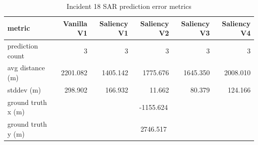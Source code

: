 \begin{table}[ht]
\centering
\caption{Incident 18 SAR prediction error metrics}
\label{tab:sar-incident-18}
\begin{tabular}{lrrrrr}
\hline
metric & Vanilla V1 & Saliency V1 & Saliency V2 & Saliency V3 & Saliency V4 \\
\hline
prediction count & 3 & 3 & 3 & 3 & 3 \\
avg distance (m) & 2201.082 & 1405.142 & 1775.676 & 1645.350 & 2008.010 \\
stddev (m) & 298.902 & 166.932 & 11.662 & 80.379 & 124.166 \\
ground truth x (m) & \multicolumn{5}{c}{-1155.624} \\
ground truth y (m) & \multicolumn{5}{c}{2746.517} \\
\hline
\end{tabular}
\end{table}

